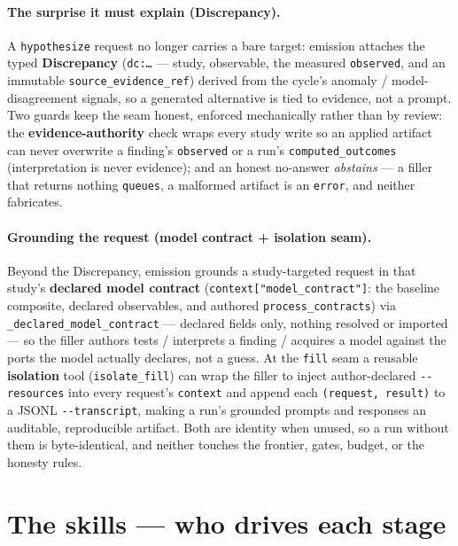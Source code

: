 \documentclass[11pt]{article}
\newcommand{\code}[1]{\texttt{\small #1}}
\begin{document}
\paragraph{The surprise it must explain (Discrepancy).} A \code{hypothesize} request no longer
carries a bare target: emission attaches the typed \textbf{Discrepancy} (\code{dc:\dots} ---
study, observable, the measured \code{observed}, and an immutable \code{source\_evidence\_ref})
derived from the cycle's anomaly / model-disagreement signals, so a generated alternative is tied
to evidence, not a prompt. Two guards keep the seam honest, enforced mechanically rather than by
review: the \textbf{evidence-authority} check wraps every study write so an applied artifact can
never overwrite a finding's \code{observed} or a run's \code{computed\_outcomes} (interpretation is
never evidence); and an honest no-answer \emph{abstains} --- a filler that returns nothing
\code{queues}, a malformed artifact is an \code{error}, and neither fabricates.

\paragraph{Grounding the request (model contract + isolation seam).} Beyond the Discrepancy,
emission grounds a study-targeted request in that study's \textbf{declared model contract}
(\code{context["model\_contract"]}: the baseline composite, declared observables, and authored
\code{process\_contracts}) via \code{\_declared\_model\_contract} --- declared fields only, nothing
resolved or imported --- so the filler authors tests / interprets a finding / acquires a model
against the ports the model actually declares, not a guess. At the \code{fill} seam a reusable
\textbf{isolation} tool (\code{isolate\_fill}) can wrap the filler to inject author-declared
\code{-{}-resources} into every request's \code{context} and append each \code{(request, result)}
to a JSONL \code{-{}-transcript}, making a run's grounded prompts and responses an auditable,
reproducible artifact. Both are identity when unused, so a run without them is byte-identical, and
neither touches the frontier, gates, budget, or the honesty rules.

\section{The skills --- who drives each stage}\label{sec:skills}
\end{document}

